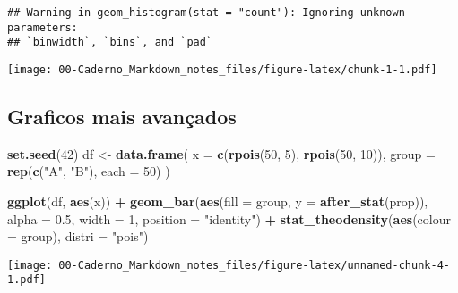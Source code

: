 \documentclass[
]{article}
\newenvironment{Shaded}{\begin{snugshade}}{\end{snugshade}}
\newcommand{\AttributeTok}[1]{\textcolor[rgb]{0.13,0.29,0.53}{#1}}
\newcommand{\DecValTok}[1]{\textcolor[rgb]{0.00,0.00,0.81}{#1}}
\newcommand{\FloatTok}[1]{\textcolor[rgb]{0.00,0.00,0.81}{#1}}
\newcommand{\FunctionTok}[1]{\textcolor[rgb]{0.13,0.29,0.53}{\textbf{#1}}}
\newcommand{\NormalTok}[1]{#1}
\newcommand{\OtherTok}[1]{\textcolor[rgb]{0.56,0.35,0.01}{#1}}
\newcommand{\SpecialCharTok}[1]{\textcolor[rgb]{0.81,0.36,0.00}{\textbf{#1}}}
\newcommand{\StringTok}[1]{\textcolor[rgb]{0.31,0.60,0.02}{#1}}
\begin{document}
\begin{verbatim}
## Warning in geom_histogram(stat = "count"): Ignoring unknown parameters:
## `binwidth`, `bins`, and `pad`
\end{verbatim}

\texttt{[image: 00-Caderno\_Markdown\_notes\_files/figure-latex/chunk-1-1.pdf]}

\subsection{Graficos mais avançados}\label{graficos-mais-avanuxe7ados}

\begin{Shaded}
\begin{Highlighting}[]
\FunctionTok{set.seed}\NormalTok{(}\DecValTok{42}\NormalTok{)}
\NormalTok{df }\OtherTok{\textless{}{-}} \FunctionTok{data.frame}\NormalTok{(}
  \AttributeTok{x =} \FunctionTok{c}\NormalTok{(}\FunctionTok{rpois}\NormalTok{(}\DecValTok{50}\NormalTok{, }\DecValTok{5}\NormalTok{), }\FunctionTok{rpois}\NormalTok{(}\DecValTok{50}\NormalTok{, }\DecValTok{10}\NormalTok{)),}
  \AttributeTok{group =} \FunctionTok{rep}\NormalTok{(}\FunctionTok{c}\NormalTok{(}\StringTok{"A"}\NormalTok{, }\StringTok{"B"}\NormalTok{), }\AttributeTok{each =} \DecValTok{50}\NormalTok{)}
\NormalTok{)}

\FunctionTok{ggplot}\NormalTok{(df, }\FunctionTok{aes}\NormalTok{(x)) }\SpecialCharTok{+}
  \FunctionTok{geom\_bar}\NormalTok{(}\FunctionTok{aes}\NormalTok{(}\AttributeTok{fill =}\NormalTok{ group, }\AttributeTok{y =} \FunctionTok{after\_stat}\NormalTok{(prop)),}
           \AttributeTok{alpha =} \FloatTok{0.5}\NormalTok{, }\AttributeTok{width =} \DecValTok{1}\NormalTok{, }\AttributeTok{position =} \StringTok{"identity"}\NormalTok{) }\SpecialCharTok{+}
  \FunctionTok{stat\_theodensity}\NormalTok{(}\FunctionTok{aes}\NormalTok{(}\AttributeTok{colour =}\NormalTok{ group), }\AttributeTok{distri =} \StringTok{"pois"}\NormalTok{)}
\end{Highlighting}
\end{Shaded}

\texttt{[image: 00-Caderno\_Markdown\_notes\_files/figure-latex/unnamed-chunk-4-1.pdf]}
\end{document}
